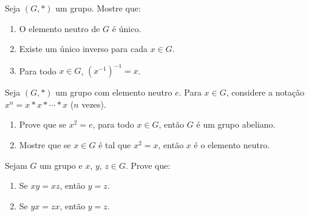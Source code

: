 \documentclass[12pt]{exam}
\begin{document}



    \vspace{.3cm}

    \questao{} Seja $(G,*)$ um grupo. Mostre que:
    \begin{enumerate}[label={\alph*})]
        \item O elemento neutro de $G$ {\'e} {\'u}nico.

        \item Existe um {\'u}nico inverso para cada $x \in G$.

        \item Para todo $x \in G$, $(x^{-1})^{-1} = x$.
    \end{enumerate}

    \vspace{.3cm}

    \questao{} Seja $(G,*)$ um grupo com elemento neutro $e$. Para $x\in
    G$, considere a nota{\c c}{\~a}o $x^n=x*x*\cdots *x$ ($n$ vezes).
    \begin{enumerate}[label=({\alph*})]
        \item Prove que se
        $x^2 = e$, para todo $x\in G$, ent{\~a}o $G$ {\'e} um grupo abeliano.

        \item Mostre que se $x\in G$ {\'e} tal que $x^2 = x$, ent{\~a}o $x$ {\'e} o elemento neutro.
    \end{enumerate}

    \newpage

    \questao{} Sejam $G$ um grupo e $x$, $y$, $z \in G$. Prove que:
    \begin{enumerate}[label=({\alph*})]
        \item Se $xy = xz$, ent\~ao $y = z$.

        \item Se $yx = zx$, ent\~ao $y = z$.
    \end{enumerate}

    \vspace{.3cm}
\end{document}
